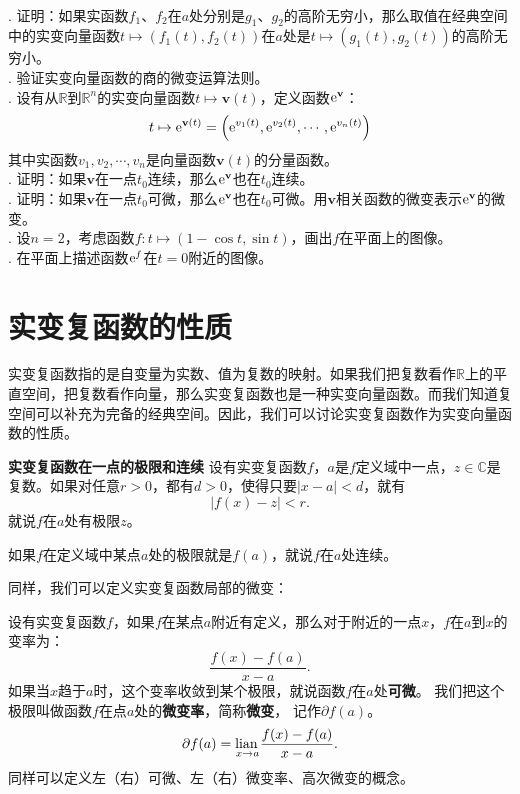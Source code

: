 \documentclass[12pt,UTF8]{ctexbook}
\begin{document}
\begin{xt}
    \mbox{} \\
    . 证明：如果实函数$f_1$、$f_2$在$a$处分别是$g_1$、$g_2$的高阶无穷小，那么取值在经典空间中的实变向量函数$t\mapsto (f_1(t), f_2(t))$在$a$处是$t\mapsto (g_1(t), g_2(t))$的高阶无穷小。\\
    . 验证实变向量函数的商的微变运算法则。\\
    . 设有从$\mathbb{R}$到$\mathbb{R}^n$的实变向量函数$t\mapsto \mathbf{v}(t)$，定义函数$\mathrm{e}^{\mathbf{v}}$：
    $$ t\mapsto \mathrm{e}^{\mathbf{v}(t)} = \left(\mathrm{e}^{v_1(t)}, \mathrm{e}^{v_2(t)}, \cdots , \mathrm{e}^{v_n(t)}\right)$$
    其中实函数$v_1, v_2, \cdots, v_n$是向量函数$\mathbf{v}(t)$的分量函数。\\
    . 证明：如果$\mathbf{v}$在一点$t_0$连续，那么$\mathrm{e}^{\mathbf{v}}$也在$t_0$连续。\\
    . 证明：如果$\mathbf{v}$在一点$t_0$可微，那么$\mathrm{e}^{\mathbf{v}}$也在$t_0$可微。用$\mathbf{v}$相关函数的微变表示$\mathrm{e}^{\mathbf{v}}$的微变。\\
    . 设$n=2$，考虑函数$f: t\mapsto (1 - \cos{t}, \sin{t})$，画出$f$在平面上的图像。\\
    . 在平面上描述函数$\mathrm{e}^f$在$t=0$附近的图像。
\end{xt}

\section{实变复函数的性质}

实变复函数指的是自变量为实数、值为复数的映射。如果我们把复数看作$\mathbb{R}$上的平直空间，把复数看作向量，那么实变复函数也是一种实变向量函数。而我们知道复空间可以补充为完备的经典空间。因此，我们可以讨论实变复函数作为实变向量函数的性质。

\begin{df}{\textbf{实变复函数在一点的极限和连续}}
    设有实变复函数$f$，$a$是$f$定义域中一点，$z\in\mathbb{C}$是复数。如果对任意$r>0$，都有$d>0$，使得只要$|x - a| < d$，就有
    $$|f(x) - z| < r.$$
    就说$f$在$a$处有极限$z$。

    如果$f$在定义域中某点$a$处的极限就是$f(a)$，就说$f$在$a$处连续。
\end{df}

同样，我们可以定义实变复函数局部的微变：
\begin{df}
    设有实变复函数$f$，如果$f$在某点$a$附近有定义，那么对于附近的一点$x$，$f$在$a$到$x$的变率为：
    $$ \frac{f(x) - f(a)}{x - a}.$$
    如果当$x$趋于$a$时，这个变率收敛到某个极限，就说函数$f$在$a$处\textbf{可微}。
    我们把这个极限叫做函数$f$在点$a$处的\textbf{微变率}，简称\textbf{微变}，
    记作$\partial f(a)$。
    $$ \partial f(a) = \underset{{x\to a}}{\operatorname{lian}\,} \frac{f(x) - f(a)}{x - a}. $$
    同样可以定义左（右）可微、左（右）微变率、高次微变的概念。
\end{df}
\end{document}
